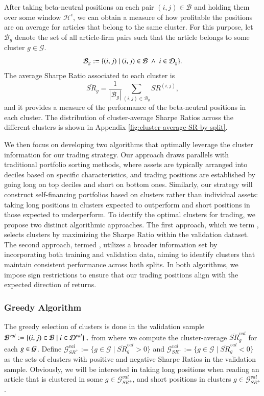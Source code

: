 After taking beta-neutral positions on each pair $(i,j)\in\mathcal B$ and holding them over some window $\mathcal H^i$, we can obtain a measure of how profitable the positions are on average for articles that belong to the same cluster.
For this purpose, let $\mathcal{B}_g$ denote the set of all article-firm pairs such that the article belongs to some cluster $g\in\mathcal G$. 
$$
\mathcal{B}_g:= \{(i,j) \mid (i,j)\in\mathcal{B} ~\wedge~ i \in \mathcal{D}_g \}
.
$$
The average Sharpe Ratio associated to each cluster is
$$
\overline{S R}_g=\frac{1}{\left|\mathcal{B}_g\right|} \sum_{(i,j) \in \mathcal{B}_g} S R^{(i,j)}
,
$$
and it provides a measure of the performance of the beta-neutral positions in each cluster. 
%
%
The distribution of cluster-average Sharpe Ratios across the different clusters is shown in Appendix \cref{fig:cluster-average-SR-by-split}. 


We then focus on developing two algorithms that optimally leverage the cluster information for our trading strategy. Our approach draws parallels with traditional portfolio sorting methods, where assets are typically arranged into deciles based on specific characteristics, and trading positions are established by going long on top deciles and short on bottom ones. Similarly, our strategy will construct self-financing portfolios based on clusters rather than individual assets: taking long positions in clusters expected to outperform and short positions in those expected to underperform.
%
To identify the optimal clusters for trading, we propose two distinct algorithmic approaches. The first approach, which we term , selects clusters by maximizing the Sharpe Ratio within the validation dataset. The second approach, termed , utilizes a broader information set by incorporating both training and validation data, aiming to identify clusters that maintain consistent performance across both splits. In both algorithms, we impose sign restrictions to ensure that our trading positions align with the expected direction of returns.

\subsubsection{Greedy Algorithm}

The greedy selection of clusters is done in the validation sample 
$
\mathcal{B}^{val}:= \{
(i,j)\in\mathcal{B} 
 \mid 
  i \in \mathcal{D}^{val} \}
~,
$
from where we compute the cluster-average $\overline{S R}_g^{val}$ for each $g\in\mathcal{G}$.
%
Define $\mathcal G_{SR^+}^{val}:=\{ g\in \mathcal G \mid \overline{SR}_g^{val} >0\}$ and $\mathcal G_{SR^-}^{val}:=\{ g\in \mathcal G \mid \overline{SR}_g^{val} <0\}$ as the sets of clusters with positive and negative Sharpe Ratios in the validation sample. Obviously, we will be interested in taking long positions when reading an article that is clustered in some $g\in \mathcal G_{SR^+}^{val}$, and short positions in clusters $g\in \mathcal G_{SR^+}^{val}$. 

